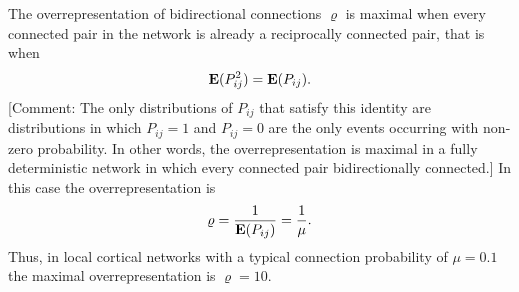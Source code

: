 
The overrepresentation of bidirectional connections $\varrho$ is maximal when every connected pair in the network is already a reciprocally connected pair, that is when
\[
\operatorname{\mathbf{E}}(P_{ij}^2) = \operatorname{\mathbf{E}}(P_{ij}).
\]
[Comment: The only distributions of $P_{ij}$ that satisfy this identity are distributions in which $P_{ij}=1$ and $P_{ij}=0$ are the only events occurring with non-zero probability. In other words, the overrepresentation is maximal in a fully deterministic network in which every connected pair bidirectionally connected.]
%
In this case the overrepresentation is
\[
\varrho = \frac{1}{\operatorname{\mathbf{E}}(P_{ij})} = \frac{1}{\mu}.
\]
Thus, in local cortical networks with a typical connection probability of $\mu = 0.1$ the maximal overrepresentation is $\varrho = 10$.
